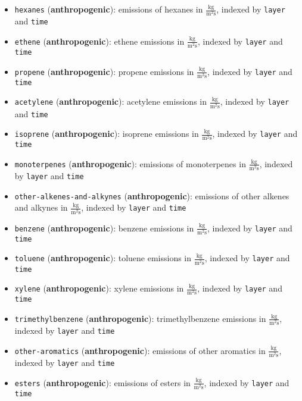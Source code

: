 \begin{itemize}
    \item \texttt{hexanes} (\textbf{anthropogenic}): emissions of hexanes in $\frac{\text{kg}}{\text{m}^2 \text{s}}$, indexed by \texttt{layer} and \texttt{time}
    \item \texttt{ethene} (\textbf{anthropogenic}): ethene emissions in $\frac{\text{kg}}{\text{m}^2 \text{s}}$, indexed by \texttt{layer} and \texttt{time}
    \item \texttt{propene} (\textbf{anthropogenic}): propene emissions in $\frac{\text{kg}}{\text{m}^2 \text{s}}$, indexed by \texttt{layer} and \texttt{time}
    \item \texttt{acetylene} (\textbf{anthropogenic}): acetylene emissions in $\frac{\text{kg}}{\text{m}^2 \text{s}}$, indexed by \texttt{layer} and \texttt{time}
    \item \texttt{isoprene} (\textbf{anthropogenic}): isoprene emissions in $\frac{\text{kg}}{\text{m}^2 \text{s}}$, indexed by \texttt{layer} and \texttt{time}
    \item \texttt{monoterpenes} (\textbf{anthropogenic}): emissions of monoterpenes in $\frac{\text{kg}}{\text{m}^2 \text{s}}$, indexed by \texttt{layer} and \texttt{time}
    \item \texttt{other-alkenes-and-alkynes} (\textbf{anthropogenic}): emissions of other alkenes and alkynes in $\frac{\text{kg}}{\text{m}^2 \text{s}}$, indexed by \texttt{layer} and \texttt{time}
    \item \texttt{benzene} (\textbf{anthropogenic}): benzene emissions in $\frac{\text{kg}}{\text{m}^2 \text{s}}$, indexed by \texttt{layer} and \texttt{time}
    \item \texttt{toluene} (\textbf{anthropogenic}): toluene emissions in $\frac{\text{kg}}{\text{m}^2 \text{s}}$, indexed by \texttt{layer} and \texttt{time}
    \item \texttt{xylene} (\textbf{anthropogenic}): xylene emissions in $\frac{\text{kg}}{\text{m}^2 \text{s}}$, indexed by \texttt{layer} and \texttt{time}
    \item \texttt{trimethylbenzene} (\textbf{anthropogenic}): trimethylbenzene emissions in $\frac{\text{kg}}{\text{m}^2 \text{s}}$, indexed by \texttt{layer} and \texttt{time}
    \item \texttt{other-aromatics} (\textbf{anthropogenic}): emissions of other aromatics in $\frac{\text{kg}}{\text{m}^2 \text{s}}$, indexed by \texttt{layer} and \texttt{time}
    \item \texttt{esters} (\textbf{anthropogenic}): emissions of esters in $\frac{\text{kg}}{\text{m}^2 \text{s}}$, indexed by \texttt{layer} and \texttt{time}

\end{itemize}
